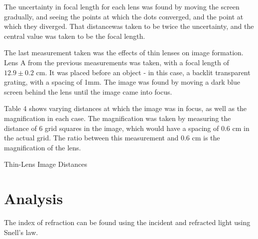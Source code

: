 \documentclass[journal]{IEEEtran}
\begin{document}
The uncertainty in focal length for each lens was found by moving the screen
gradually, and seeing the points at which the dots converged, and the point at
which they diverged. That distancewas taken to be twice the uncertainty, and
the central value was taken to be the focal length. 

The last measurement taken was the effects of thin lenses on image formation.
Lens A from the previous measurements was taken, with a focal length of $12.9
\pm 0.2$ cm. It was placed before an object - in this case, a backlit
transparent grating, with a spacing of 1mm. The image was found by moving a
dark blue screen behind the lens until the image came into focus.

Table 4 shows varying distances at which the image was in focus, as well as the
magnification in each case. The magnification was taken by measuring the
distance of 6 grid squares in the image, which would have a spacing of 0.6 cm
in the actual grid. The ratio between this measurement and 0.6 cm is the
magnification of the lens.

\begin{table}[ht!]
    \centering
    \caption*{\normalsize{Thin-Lens Image Distances}}
    \medskip
    \caption*{Table 4: Magnification of thin lens at varying object/image
    distances.}
\end{table}

\section{Analysis}

The index of refraction can be found using the incident and refracted light
using Snell's law.
\end{document}
